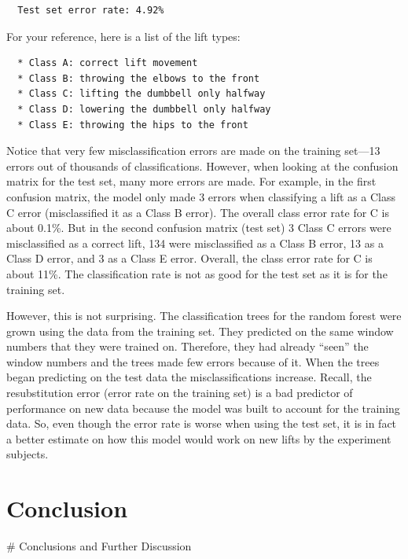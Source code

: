 \documentclass[12pt,twoside]{reedthesis}
\begin{document}
  \begin{verbatim}
  Test set error rate: 4.92%
  \end{verbatim}
  
  For your reference, here is a list of the lift types:
  
  \begin{verbatim}
  * Class A: correct lift movement
  * Class B: throwing the elbows to the front
  * Class C: lifting the dumbbell only halfway
  * Class D: lowering the dumbbell only halfway
  * Class E: throwing the hips to the front
  \end{verbatim}
  
  Notice that very few misclassification errors are made on the training
  set---13 errors out of thousands of classifications. However, when
  looking at the confusion matrix for the test set, many more errors are
  made. For example, in the first confusion matrix, the model only made 3
  errors when classifying a lift as a Class C error (misclassified it as a
  Class B error). The overall class error rate for C is about 0.1\%. But
  in the second confusion matrix (test set) 3 Class C errors were
  misclassified as a correct lift, 134 were misclassified as a Class B
  error, 13 as a Class D error, and 3 as a Class E error. Overall, the
  class error rate for C is about 11\%. The classification rate is not as
  good for the test set as it is for the training set.
  
  However, this is not surprising. The classification trees for the random
  forest were grown using the data from the training set. They predicted
  on the same window numbers that they were trained on. Therefore, they
  had already ``seen'' the window numbers and the trees made few errors
  because of it. When the trees began predicting on the test data the
  misclassifications increase. Recall, the resubstitution error (error
  rate on the training set) is a bad predictor of performance on new data
  because the model was built to account for the training data. So, even
  though the error rate is worse when using the test set, it is in fact a
  better estimate on how this model would work on new lifts by the
  experiment subjects.
  
  \chapter*{Conclusion}\label{conclusion}
  
  \# Conclusions and Further Discussion
  
\end{document}
